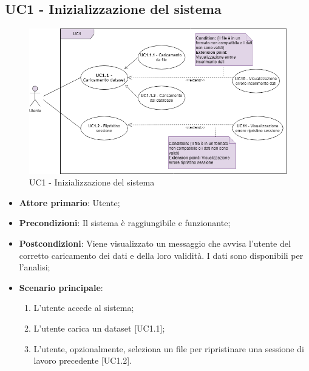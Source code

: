 \subsection{UC1 - Inizializzazione del sistema}
\begin{figure}[h]
\includegraphics[width=\linewidth]{section/Images/UC1.png}
\centering
\caption{UC1 - Inizializzazione del sistema}
\end{figure}
\begin{itemize}
	\item \textbf{Attore primario}: Utente;
	\item \textbf{Precondizioni}: Il sistema è raggiungibile e funzionante;
	\item \textbf{Postcondizioni}: Viene visualizzato un messaggio che avvisa l'utente del corretto caricamento dei dati e della loro validità. I dati sono disponibili per l'analisi;
	\item \textbf{Scenario principale}:
		\begin{enumerate}
			\item L'utente accede al sistema;
			\item L'utente carica un dataset [UC1.1];
			\item L'utente, opzionalmente, seleziona un file per ripristinare una sessione di lavoro precedente [UC1.2].
			
		\end{enumerate}
\end{itemize}
\newpage






  